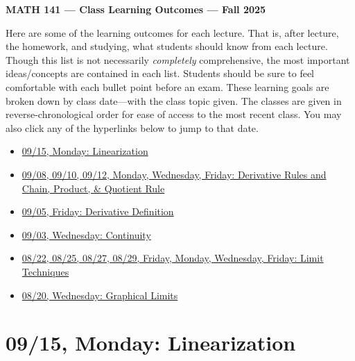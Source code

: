 \documentclass[11pt,letterpaper]{article}
\begin{document}
\begin{center} {\bfseries \LARGE MATH 141 --- Class Learning Outcomes --- Fall 2025} \end{center}

Here are some of the learning outcomes for each lecture. That is, after lecture, the homework, and studying, what students should know from each lecture. Though this list is not necessarily \textit{completely} comprehensive, the most important ideas/concepts are contained in each list. Students should be sure to feel comfortable with each bullet point before an exam. These learning goals are broken down by class date---with the class topic given. The classes are given in reverse-chronological order for ease of access to the most recent class. You may also click any of the hyperlinks below to jump to that date. 

\begin{itemize}
\item \hyperref[09-15]{09/15, Monday: Linearization}
\item \hyperref[09-08--09-12]{09/08, 09/10, 09/12, Monday, Wednesday, Friday: Derivative Rules and Chain, Product, \& Quotient Rule}
\item \hyperref[09-05]{09/05, Friday: Derivative Definition}
\item \hyperref[09-03]{09/03, Wednesday: Continuity}
\item \hyperref[08-22--08-29]{08/22, 08/25, 08/27, 08/29, Friday, Monday, Wednesday, Friday: Limit Techniques}
\item \hyperref[08-20]{08/20, Wednesday: Graphical Limits}
\end{itemize}

\newpage
\section*{09/15, Monday: Linearization\label{09-15}}
\end{document}
